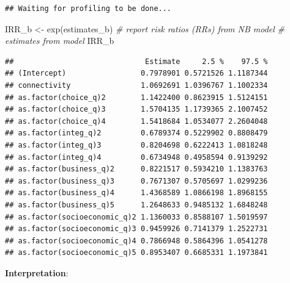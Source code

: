 \documentclass[
]{book}
\newenvironment{Shaded}{\begin{snugshade}}{\end{snugshade}}
\newcommand{\CommentTok}[1]{\textcolor[rgb]{0.56,0.35,0.01}{\textit{#1}}}
\newcommand{\FunctionTok}[1]{\textcolor[rgb]{0.00,0.00,0.00}{#1}}
\newcommand{\NormalTok}[1]{#1}
\newcommand{\OtherTok}[1]{\textcolor[rgb]{0.56,0.35,0.01}{#1}}
\begin{document}
\begin{verbatim}
## Waiting for profiling to be done...
\end{verbatim}

\begin{Shaded}
\begin{Highlighting}[]
\NormalTok{IRR\_b }\OtherTok{\textless{}{-}} \FunctionTok{exp}\NormalTok{(estimates\_b)}
\CommentTok{\# report risk ratios (RRs) from NB model}
\CommentTok{\# estimates from model}
\NormalTok{IRR\_b}
\end{Highlighting}
\end{Shaded}

\begin{verbatim}
##                              Estimate     2.5 %    97.5 %
## (Intercept)                 0.7978901 0.5721526 1.1187344
## connectivity                1.0692691 1.0396767 1.1002334
## as.factor(choice_q)2        1.1422400 0.8623915 1.5124151
## as.factor(choice_q)3        1.5704135 1.1739365 2.1007452
## as.factor(choice_q)4        1.5418684 1.0534077 2.2604048
## as.factor(integ_q)2         0.6789374 0.5229902 0.8808479
## as.factor(integ_q)3         0.8204698 0.6222413 1.0818248
## as.factor(integ_q)4         0.6734948 0.4958594 0.9139292
## as.factor(business_q)2      0.8221517 0.5934210 1.1383763
## as.factor(business_q)3      0.7671307 0.5705697 1.0299236
## as.factor(business_q)4      1.4368589 1.0866198 1.8968155
## as.factor(business_q)5      1.2648633 0.9485132 1.6848248
## as.factor(socioeconomic_q)2 1.1360033 0.8588107 1.5019597
## as.factor(socioeconomic_q)3 0.9459926 0.7141379 1.2522731
## as.factor(socioeconomic_q)4 0.7866948 0.5864396 1.0541278
## as.factor(socioeconomic_q)5 0.8953407 0.6685331 1.1973841
\end{verbatim}

\textbf{Interpretation}:
\end{document}
